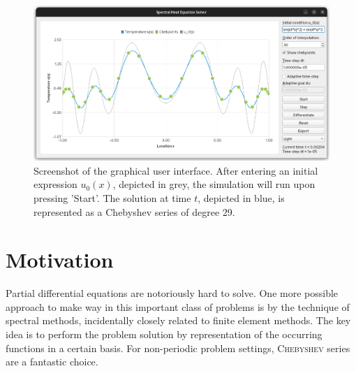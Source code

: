\documentclass[12pt, a4paper]{article}
\begin{document}
  \begin{figure}[H]
    \centering
    \includegraphics[width=\linewidth]{figures/screenshot.png}
    \caption{Screenshot of the graphical user interface. After entering an initial expression $u_0(x)$, depicted in grey, the simulation will run upon pressing 'Start'. The solution at time $t$, depicted in blue, is represented as a Chebyshev series of degree 29.}
  \end{figure}

  \pagebreak
  \pagestyle{normal}


  \section{Motivation}
  Partial differential equations are notoriously hard to solve. One more possible approach to make way in this important class of problems is by the technique of spectral methods, incidentally closely related to finite element methods.
  The key idea is to perform the problem solution by representation of the occurring functions in a certain basis.
  For non-periodic problem settings, \textsc{Chebyshev} series are a fantastic choice.
\end{document}
